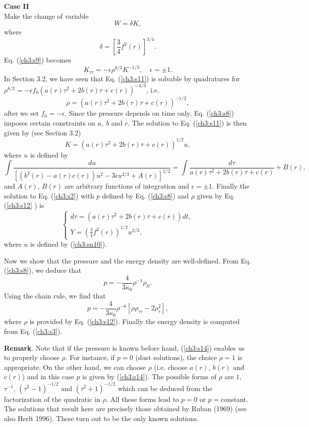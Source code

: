 {{\bf Case II  }\\
Make the change of variable
\[ W =\delta K,\]
where
\[\delta=\left [\frac{3}{4} f^2(r)\right ]^{3/4}.\]
Eq. (\ref{ch3:s9}) becomes
\begin{equation}
K_{\tau\tau}=-\epsilon \rho^{8/3}K^{-1/3},\quad \epsilon=\pm 1. \label{ch3:s11}
\end{equation}
In Section 3.2, we have seen that Eq. (\ref{ch3:s11}) is solvable by quadratures
for $\rho^{8/3}=-\epsilon f_0(a(r)\tau^2+2b(r)\tau+c(r))^{-4/3}$,
i.e. 
\begin{equation}
\rho=(a(r)\tau^2+2b(r)\tau+c(r))^{-1/2},\label{ch3:s12}
\end{equation}
after we set $f_0=-\epsilon$. Since the pressure depends on time only, Eq. (\ref{ch3:s8})  
imposes certain  constraints on  $a,\;b$ and $c$. 
The solution to Eq. (\ref{ch3:s11}) is
then given by  (see Section 3.2) 
\[K=(a(r)\tau^2+2b(r)\tau+c(r))^{1/2}u,\]
where $u$ is defined by 
\begin{equation}
\int  \frac{du}{\left
[(b^2(r)-a(r)c(r))u^2-3\epsilon u^{2/3}+A(r)\right]^{1/2}} =\int
\frac{d\tau}{a(r)\tau^2+2b(r)\tau+c(r)}+B(r),\label{ch3:sn10}
\end{equation} 
and $A(r)$, $B(r)$ are arbitrary
functions of integration and $\epsilon=\pm1$. Finally the solution to Eq. (\ref{ch3:s2}) with $p$
defined by Eq. (\ref{ch3:s8}) and $\rho$ given by Eq. (\ref{ch3:s12} ) is
\begin{equation} \label{ch3:s13} \left \{ \begin{array}{lll}
d\tau=(a(r)\tau^2+2b(r)\tau+c(r)) dt,\\ Y=\left (\frac{3}{4}
f^2(r)\right )^{1/2}u^{2/3} ,\end{array} \right.
\end{equation} where $u$ is defined by (\ref{ch3:sn10}).

Now we show that the pressure and the energy
density are well-defined. From Eq. (\ref{ch3:s8}), we deduce that
\[p=-\frac{4}{3\kappa_0}\rho^{-1}\rho_{tt}.\] Using the chain
rule, we find that \begin{equation} \label{ch3:s14}
p=-\frac{4}{3\kappa_0}\rho^{-6}\left
[\rho\rho_{\tau\tau}-2\rho_\tau^2\right ], \end{equation} where
$\rho$ is provided by Eq. (\ref{ch3:s12}). Finally the energy density is
computed from Eq. (\ref{ch3:s3}). 

{\bf Remark}. Note that if the pressure is known before hand, (\ref{ch3:s14}) enables us
to properly choose $\rho$. For instance, if $p=0$ (dust solutions), the choice $\rho=1$
is appropriate. On the other hand, we can choose $\rho$ (i.e. choose $a(r)$, $b(r)$ and $c(r)$)
and in this case $p$ is given by (\ref{ch3:s14}). The possible forms of $\rho$ are $1$, $\tau^{-1}$,
$(\tau^2-1)^{-1/2}$ and $(\tau^2+1)^{-1/2}$ which can be deduced from
the factorization of the quadratic in $\rho$. All these forms lead to $p=0$ or $p=$constant.
The solutions that result here are precisely those obtained
by Ruban (1969) (see also Herlt 1996).
These turn out to be the only known solutions.

}
